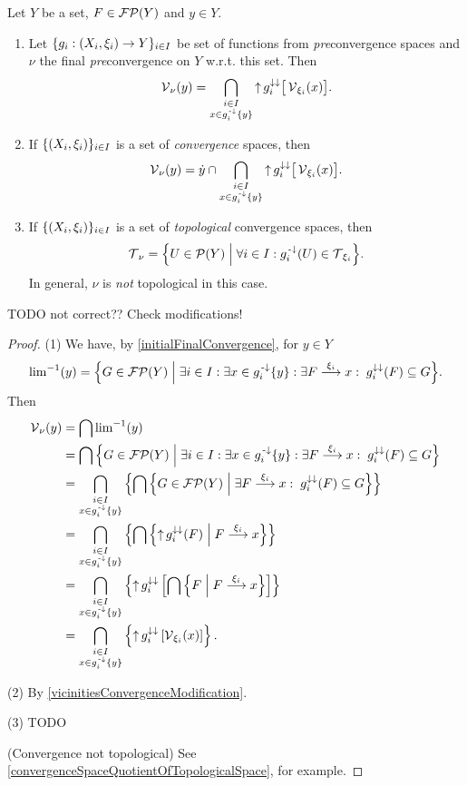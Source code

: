 \begin{proposition} \label{pretopologicalFinalConvergence}
Let $Y$ be a set, $F\in \operatorname{\mathcal{FP}}(Y)$ and $y\in Y$.
\begin{enumerate}
\item Let $\{g_i: \sSet{X_i, \xi_i} \to Y\}_{i\in I}$ be set of functions from \emph{pre}convergence spaces and $\nu$ the final \emph{pre}convergence on $Y$ w.r.t. this set. Then 
\[ \operatorname{\mathcal{V}}_\nu(y) = \bigcap_{\substack{i\in I \\ x\in g^{\text{\hspace{0.15em}-}\downarrow}_i\{y\}}}\operatorname{\uparrow} g_i^{\downarrow\downarrow}\big[\operatorname{\mathcal{V}}_{\xi_i}(x)\big]. \]
\item If $\{\sSet{X_i, \xi_i}\}_{i\in I}$ is a set of \emph{convergence} spaces, then
\[ \operatorname{\mathcal{V}}_\nu(y) = \dot{y} \cap \bigcap_{\substack{i\in I \\ x\in g^{\text{\hspace{0.15em}-}\downarrow}_i\{y\}}}\operatorname{\uparrow} g_i^{\downarrow\downarrow}\big[\operatorname{\mathcal{V}}_{\xi_i}(x)\big]. \]
\item If $\{\sSet{X_i, \xi_i}\}_{i\in I}$ is a set of \emph{topological} convergence spaces, then
\[ \topology_\nu = \setbuilder{U\in\powerset(Y)}{\forall i\in I: g_i^{\preimf}(U)\in\topology_{\xi_i}}. \]
In general, $\nu$ is \emph{not} topological in this case.
\end{enumerate}
\end{proposition}
TODO not correct?? Check modifications!
\begin{proof}
(1) We have, by \ref{initialFinalConvergence}, for $y\in Y$
\[ {\lim}^{-1}(y) = \setbuilder{G\in\powerfilters(Y)}{\exists i\in I: \exists x\in g_i^\preimf\{y\}: \exists F\overset{\xi_i}{\longrightarrow}x:\; g_i^{\imf\imf}(F)\subseteq G}. \]
Then
\begin{align*}
\vicinities_\nu(y) &= \bigcap {\lim}^{-1}(y) \\
&= \bigcap \setbuilder{G\in\powerfilters(Y)}{\exists i\in I: \exists x\in g_i^\preimf\{y\}: \exists F\overset{\xi_i}{\longrightarrow}x:\; g_i^{\imf\imf}(F)\subseteq G} \\
&= \bigcap_{\substack{i\in I \\ x\in g^\preimf_i\{y\}}} \left\{ \bigcap\setbuilder{G\in\powerfilters(Y)}{\exists F\overset{\xi_i}{\longrightarrow}x:\; g_i^{\imf\imf}(F)\subseteq G} \right\} \\
&= \bigcap_{\substack{i\in I \\ x\in g^\preimf_i\{y\}}} \left\{ \bigcap\setbuilder{\upset g_i^{\imf\imf}(F)}{F\overset{\xi_i}{\longrightarrow}x} \right\} \\
&= \bigcap_{\substack{i\in I \\ x\in g^\preimf_i\{y\}}} \left\{ \upset g_i^{\imf\imf}\left[\bigcap\setbuilder{F}{F\overset{\xi_i}{\longrightarrow}x}\right] \right\} \\
&= \bigcap_{\substack{i\in I \\ x\in g^\preimf_i\{y\}}} \left\{ \upset g_i^{\imf\imf}\left[\vicinities_{\xi_i}(x)\right] \right\}.
\end{align*}

(2) By \ref{vicinitiesConvergenceModification}.

(3) TODO

(Convergence not topological) See \ref{convergenceSpaceQuotientOfTopologicalSpace}, for example.
\end{proof}

